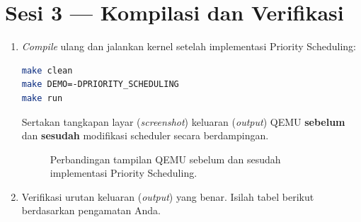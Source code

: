 \section{Sesi 3 — Kompilasi dan Verifikasi}

\begin{enumerate}

	\item \textit{Compile} ulang dan jalankan kernel setelah implementasi Priority Scheduling:
	      \begin{lstlisting}[language=bash, caption={Compile dan jalankan dengan Priority Scheduling}]
make clean
make DEMO=-DPRIORITY_SCHEDULING
make run
    \end{lstlisting}

	      Sertakan tangkapan layar (\textit{screenshot}) keluaran (\textit{output}) QEMU \textbf{sebelum} dan \textbf{sesudah} modifikasi scheduler secara berdampingan.

	      \begin{figure}[H]
		      \centering
		      \begin{minipage}[t]{0.48\textwidth}
			      \centering
			      \caption*{(a) Sebelum modifikasi (Round-Robin)}
		      \end{minipage}%
		      \hfill
		      \begin{minipage}[t]{0.48\textwidth}
			      \centering
			      \caption*{(b) Setelah modifikasi (Priority Scheduling)}
		      \end{minipage}
		      \caption{Perbandingan tampilan QEMU sebelum dan sesudah implementasi Priority Scheduling.}
		      \label{fig:h06-compare}
	      \end{figure}

	\item Verifikasi urutan keluaran (\textit{output}) yang benar. Isilah tabel berikut berdasarkan pengamatan Anda.


\end{enumerate}
